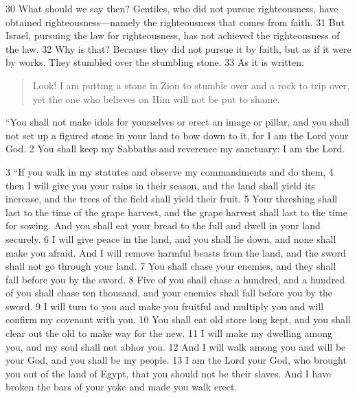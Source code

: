 \begin{bible}

30 What should we say then? Gentiles, who did not pursue righteousness, have obtained righteousness—namely the righteousness that comes from faith. 31 But Israel, pursuing the law for righteousness, has not achieved the righteousness of the law. 32 Why is that? Because they did not pursue it by faith, but as if it were by works. They stumbled over the stumbling stone. 33 As it is written:
\begin{quote}
Look! I am putting a stone in Zion to stumble over
and a rock to trip over,
yet the one who believes on Him will not be put to shame.
\end{quote}


``You shall not make idols for yourselves or erect an image or pillar, and you shall not set up a figured stone in your land to bow down to it, for I am the Lord your God. 2 You shall keep my Sabbaths and reverence my sanctuary: I am the Lord.

3 ``If you walk in my statutes and observe my commandments and do them, 4 then I will give you your rains in their season, and the land shall yield its increase, and the trees of the field shall yield their fruit. 5 Your threshing shall last to the time of the grape harvest, and the grape harvest shall last to the time for sowing. And you shall eat your bread to the full and dwell in your land securely. 6 I will give peace in the land, and you shall lie down, and none shall make you afraid. And I will remove harmful beasts from the land, and the sword shall not go through your land. 7 You shall chase your enemies, and they shall fall before you by the sword. 8 Five of you shall chase a hundred, and a hundred of you shall chase ten thousand, and your enemies shall fall before you by the sword. 9 I will turn to you and make you fruitful and multiply you and will confirm my covenant with you. 10 You shall eat old store long kept, and you shall clear out the old to make way for the new. 11 I will make my dwelling among you, and my soul shall not abhor you. 12 And I will walk among you and will be your God, and you shall be my people. 13 I am the Lord your God, who brought you out of the land of Egypt, that you should not be their slaves. And I have broken the bars of your yoke and made you walk erect.


\end{bible}

